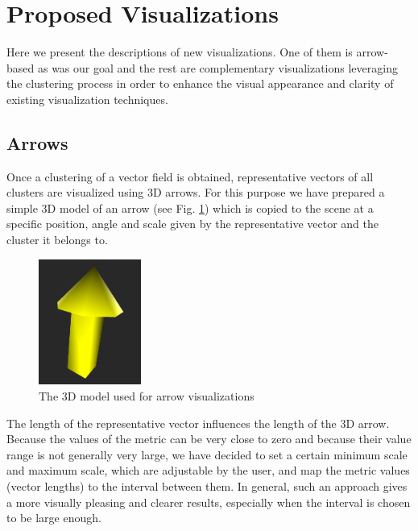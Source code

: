 \section{Proposed Visualizations}
\label{sec:analysis-visualizations}

Here we present the descriptions of new visualizations. One of them is arrow-based as was our goal and the rest are complementary visualizations leveraging the clustering process in order to enhance the visual appearance and clarity of existing visualization techniques.

\subsection{Arrows}
\label{subsec:analysis-visualizations-arrows}

Once a clustering of a vector field is obtained, representative vectors of all clusters are visualized using 3D arrows. For this purpose we have prepared a simple 3D model of an arrow (see Fig. \ref{fig:meshdiff-arrow_model8}) which is copied to the scene at a specific position, angle and scale given by the representative vector and the cluster it belongs to.

\begin{figure}[h]
\centering
\includegraphics[width=0.3\textwidth]{./img/arrow_model.PNG}
\caption[Arrow Model]{The 3D model used for arrow visualizations}
\label{fig:meshdiff-arrow_model8}
\end{figure}

The length of the representative vector influences the length of the 3D arrow. Because the values of the metric can be very close to zero and because their value range is not generally very large, we have decided to set a certain minimum scale and maximum scale, which are adjustable by the user, and map the metric values (vector lengths) to the interval between them. In general, such an approach gives a more visually pleasing and clearer results, especially when the interval is chosen to be large enough.

